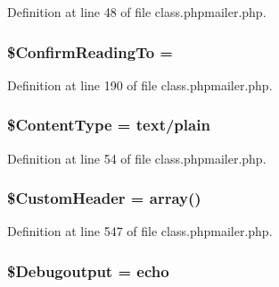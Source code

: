 Definition at line 48 of file class.\+phpmailer.\+php.

\subsubsection[{\texorpdfstring{\$\+Confirm\+Reading\+To}{$ConfirmReadingTo}}]{\setlength{\rightskip}{0pt plus 5cm}\$Confirm\+Reading\+To = \textquotesingle{}\textquotesingle{}}\hypertarget{class_p_h_p_mailer_a7bd5233c41d3f1cd2b653433fa88b8ed}{}\label{class_p_h_p_mailer_a7bd5233c41d3f1cd2b653433fa88b8ed}


Definition at line 190 of file class.\+phpmailer.\+php.

\subsubsection[{\texorpdfstring{\$\+Content\+Type}{$ContentType}}]{\setlength{\rightskip}{0pt plus 5cm}\$Content\+Type = \textquotesingle{}text/plain\textquotesingle{}}\hypertarget{class_p_h_p_mailer_a35c42684e94e56e60bfc1a8ec2cbcd08}{}\label{class_p_h_p_mailer_a35c42684e94e56e60bfc1a8ec2cbcd08}


Definition at line 54 of file class.\+phpmailer.\+php.

\subsubsection[{\texorpdfstring{\$\+Custom\+Header}{$CustomHeader}}]{\setlength{\rightskip}{0pt plus 5cm}\$Custom\+Header = array()\hspace{0.3cm}{\ttfamily [protected]}}\hypertarget{class_p_h_p_mailer_a14f2a8bd0d170d40810d432f58884f93}{}\label{class_p_h_p_mailer_a14f2a8bd0d170d40810d432f58884f93}


Definition at line 547 of file class.\+phpmailer.\+php.

\subsubsection[{\texorpdfstring{\$\+Debugoutput}{$Debugoutput}}]{\setlength{\rightskip}{0pt plus 5cm}\$Debugoutput = \textquotesingle{}echo\textquotesingle{}}\hypertarget{class_p_h_p_mailer_a532f3412f3d97a106a36ff2b49409e42}{}\label{class_p_h_p_mailer_a532f3412f3d97a106a36ff2b49409e42}


